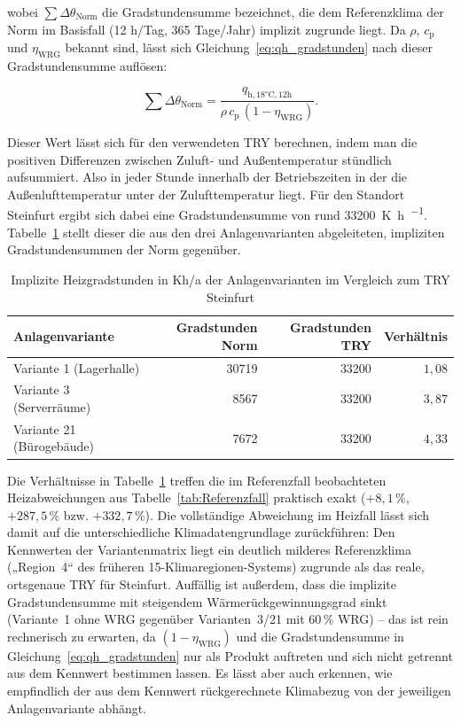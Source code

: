\documentclass{scrreprt}
\begin{document}
wobei $\sum \Delta\theta_{\mathrm{Norm}}$ die Gradstundensumme
bezeichnet, die dem Referenzklima der Norm im Basisfall (12 h/Tag,
365 Tage/Jahr) implizit zugrunde liegt. Da $\rho$, $c_{\mathrm{p}}$
und $\eta_{\mathrm{WRG}}$ bekannt sind, lässt sich
Gleichung~\eqref{eq:qh_gradstunden} nach dieser Gradstundensumme
auflösen:

\begin{equation}\label{eq:gradstunden_norm}
    \sum \Delta\theta_{\mathrm{Norm}} = \frac{q_{\mathrm{h,18°C,12h}}}{\rho \, c_{\mathrm{p}} \, (1-\eta_{\mathrm{WRG}})}.
\end{equation}

Dieser Wert lässt sich für den verwendeten \ac{TRY} berechnen, indem man die positiven Differenzen zwischen Zuluft- und Außentemperatur stündlich aufsummiert. Also in jeder Stunde innerhalb der Betriebszeiten in der die Außenlufttemperatur unter der Zulufttemperatur liegt. Für den
Standort Steinfurt ergibt sich dabei eine Gradstundensumme von rund
\SI{33200}{\kelvin\hour\per\year}. Tabelle~\ref{tab:Gradstunden} stellt dieser
die aus den drei Anlagenvarianten abgeleiteten, impliziten
Gradstundensummen der Norm gegenüber.

\begin{table}[H]
    \centering
    \caption{Implizite Heizgradstunden in Kh/a der Anlagenvarianten im Vergleich zum TRY Steinfurt}
    \label{tab:Gradstunden}
    \begin{tabular}{lrrr}
        \toprule
        Anlagenvariante & Gradstunden Norm & Gradstunden TRY & Verhältnis \\
        \midrule
        Variante 1 (Lagerhalle) & \num{30719} & \num{33200} & $1{,}08$ \\
        Variante 3 (Serverräume) & \num{8567} & \num{33200} & $3{,}87$ \\
        Variante 21 (Bürogebäude) & \num{7672} & \num{33200} & $4{,}33$ \\
        \bottomrule
    \end{tabular}
\end{table}

Die Verhältnisse in Tabelle~\ref{tab:Gradstunden} treffen die im
Referenzfall beobachteten Heizabweichungen aus
Tabelle~\ref{tab:Referenzfall} praktisch exakt ($+8{,}1\,\%$,
$+287{,}5\,\%$ bzw. $+332{,}7\,\%$). Die vollständige Abweichung im
Heizfall lässt sich damit auf die unterschiedliche
Klimadatengrundlage zurückführen: Den Kennwerten der
Variantenmatrix liegt ein deutlich milderes Referenzklima
(„Region~4“ des früheren 15-Klimaregionen-Systems) zugrunde als das
reale, ortsgenaue \ac{TRY} für Steinfurt. Auffällig ist außerdem, dass
die implizite Gradstundensumme mit steigendem
Wärmerückgewinnungsgrad sinkt (Variante~1 ohne WRG gegenüber
Varianten~3/21 mit $60\,\%$ WRG) -- das ist rein rechnerisch zu
erwarten, da $(1-\eta_{\mathrm{WRG}})$ und die Gradstundensumme in
Gleichung~\eqref{eq:qh_gradstunden} nur als Produkt auftreten und sich
nicht getrennt aus dem Kennwert bestimmen lassen. Es lässt aber auch
erkennen, wie empfindlich der aus dem Kennwert rückgerechnete
Klimabezug von der jeweiligen Anlagenvariante abhängt.
\end{document}
